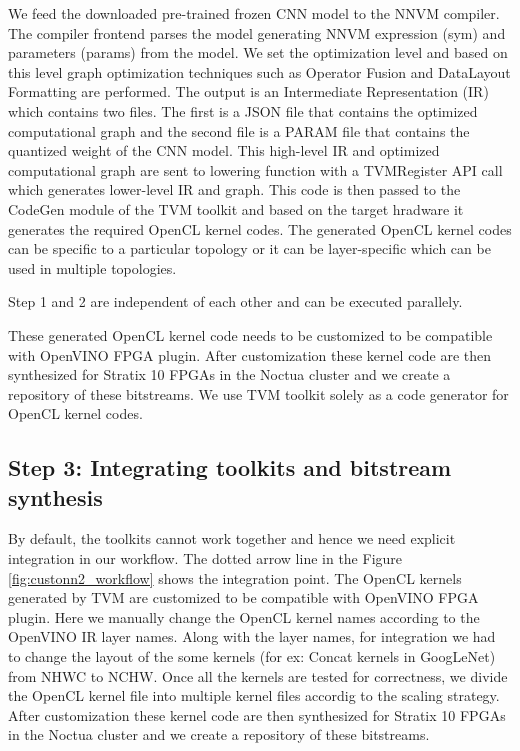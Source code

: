 We feed the downloaded pre-trained frozen CNN model to the NNVM compiler. The compiler frontend parses the model generating  NNVM expression (sym) and parameters (params) from the model. We set the optimization level and based on this level graph optimization techniques such as Operator Fusion and DataLayout Formatting are performed. The output is an Intermediate Representation (IR) which contains two files. The first is a JSON file that contains the optimized computational graph and the second file is a PARAM file that contains the quantized weight of the CNN model. This high-level IR and optimized computational graph are sent to lowering function with a TVMRegister API call which generates lower-level IR and graph. This code is then passed to the CodeGen module of the TVM toolkit and based on the target hradware it generates the required OpenCL kernel codes. The generated OpenCL kernel codes can be specific to a particular topology or it can be layer-specific which can be used in multiple topologies.

Step 1 and 2 are independent of each other and can be executed parallely.
 
These generated OpenCL kernel code needs to be customized to be compatible with OpenVINO FPGA plugin. After customization these kernel code are then synthesized for Stratix 10 FPGAs in the Noctua cluster and we create a repository of these bitstreams. We use TVM toolkit solely as a code generator for OpenCL kernel codes.

\subsection*{Step 3: Integrating toolkits and bitstream synthesis}
By default, the toolkits cannot work together and hence we need explicit integration in our workflow. The dotted arrow line in the Figure \ref{fig:custonn2_workflow} shows the integration point.
The OpenCL kernels generated by TVM are customized to be compatible with OpenVINO FPGA plugin. Here we manually change the OpenCL kernel names according to the OpenVINO IR layer names. Along with the layer names, for integration we had to change the layout of the some kernels (for ex: Concat kernels in GoogLeNet) from NHWC to NCHW. Once all the kernels are tested for correctness, we divide the OpenCL kernel file into multiple kernel files accordig to the scaling strategy. After customization these kernel code are then synthesized for Stratix 10 FPGAs in the Noctua cluster and we create a repository of these bitstreams. 
  
